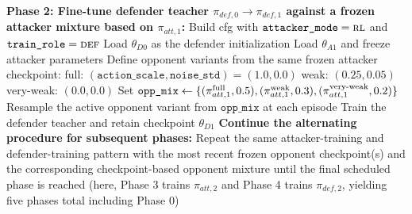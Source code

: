 \begin{algorithm}[H]
\begin{algorithmic}[1]
\State \textbf{Phase 2: Fine-tune defender teacher $\pi_{def,0}\!\rightarrow\!\pi_{def,1}$ against a frozen attacker mixture based on $\pi_{att,1}$:}
\State \hspace{1em} Build cfg with $\texttt{attacker\_mode}=\textsc{rl}$ and $\texttt{train\_role}=\textsc{def}$
\State \hspace{1em} Load $\theta_{D0}$ as the defender initialization
\State \hspace{1em} Load $\theta_{A1}$ and freeze attacker parameters
\State \hspace{1em} Define opponent variants from the same frozen attacker checkpoint:
\Statex \hspace{2em} full: $(\texttt{action\_scale},\texttt{noise\_std})=(1.0,0.0)$
\Statex \hspace{2em} weak: $(0.25,0.05)$
\Statex \hspace{2em} very-weak: $(0.0,0.0)$
\State \hspace{1em} Set
\Statex \hspace{2em}
$\texttt{opp\_mix}\gets\{(\pi_{att,1}^{\text{full}},0.5),(\pi_{att,1}^{\text{weak}},0.3),(\pi_{att,1}^{\text{very\mbox{-}weak}},0.2)\}$
\State \hspace{1em} Resample the active opponent variant from $\texttt{opp\_mix}$ at each episode
\State \hspace{1em} Train the defender teacher and retain checkpoint $\theta_{D1}$
\State \textbf{Continue the alternating procedure for subsequent phases:}
\State \hspace{1em} Repeat the same attacker-training and defender-training pattern with the most recent
\State \hspace{1em} frozen opponent checkpoint(s) and the corresponding checkpoint-based opponent mixture
\State \hspace{1em} until the final scheduled phase is reached
\State \hspace{1em} (here, Phase 3 trains $\pi_{att,2}$ and Phase 4 trains $\pi_{def,2}$, yielding five phases total including Phase 0)
\end{algorithmic}
\end{algorithm}
